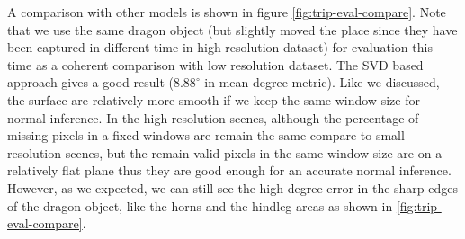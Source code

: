 A comparison with other models is shown in figure \ref{fig:trip-eval-compare}. Note that we use the same dragon object (but slightly moved the place since they have been captured in different time in high resolution dataset) for evaluation this time as a coherent comparison with low resolution dataset. The SVD based approach gives a good result ($ 8.88^\circ $ in mean degree metric). Like we discussed, the surface are relatively more smooth if we keep the same window size for normal inference. In the high resolution scenes, although the percentage of missing pixels in a fixed windows are remain the same compare to small resolution scenes, but the remain valid pixels in the same window size are on a relatively flat plane thus they are good enough for an accurate normal inference. However, as we expected, we can still see the high degree error in the sharp edges of the dragon object, like the horns and the hindleg areas as shown in \ref{fig:trip-eval-compare}.









